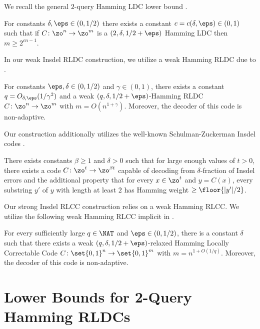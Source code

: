 We recall the general $2$-query Hamming LDC lower bound  \cite{KerenidisW04, Ben-AroyaRW08}.
\begin{theorem}\label{thm:two-query-lb}
    For constants $\delta, \eps \in (0,1/2)$ there exists a constant $c = c(\delta, \eps) \in (0,1)$ such that if $C \colon \zo^n \rightarrow \zo^m$ is a $(2, \delta, 1/2+\eps)$ Hamming LDC then $m \geq 2^{cn-1}$.
\end{theorem}

In our weak Insdel RLDC construction, we utilize a weak Hamming RLDC due to \cite{Ben-SassonGHSV06}.
\begin{lemma}\label{lem:weak-ham-rldc}
    For constants $\eps, \delta \in (0,1/2)$ and $\gamma \in (0,1)$, there exists a constant $q = O_{\delta,\eps}(1/\gamma^2)$ and a weak $(q,\delta, 1/2+\eps)$-Hamming RLDC $C \colon \zo^n \rightarrow \zo^m$ with $m = O(n^{1+\gamma})$.
    Moreover, the decoder of this code is non-adaptive.
\end{lemma}

Our construction additionally utilizes the well-known Schulman-Zuckerman Insdel codes \cite{SchZuc99}.
\begin{lemma}\label{lem:sz-code}
    There exists constants $\beta \geq 1$ and $\delta > 0$ such that for large enough values of $t > 0$, there exists a code $C \colon \zo^t \rightarrow \zo^{\beta t}$ capable of decoding from $\delta$-fraction of Insdel errors and the additional property that for every $x \in \zo^t$ and $y = C(x)$, every substring $y'$ of $y$ with length at least $2$ has Hamming weight $\geq \floor{|y'|/2}$.
\end{lemma}

Our strong Insdel RLCC construction relies on a weak Hamming RLCC.
We utilize the following weak Hamming RLCC implicit in \cite{AsadiS21}.
\begin{lemma}
\label{lem:rlcc}
    For every sufficiently large $q\in \NAT$ and $\eps\in (0,1/2)$, there is a constant $\delta$ such that there exists a weak $(q, \delta, 1/2 + \eps)$-relaxed Hamming Locally Correctable Code $C\colon \set{0,1}^n\rightarrow \set{0,1}^m$ with $m = n^{1+O(1/q)}$. 
    Moreover, the decoder of this code is non-adaptive.
\end{lemma}

\section{Lower Bounds for 2-Query Hamming RLDCs} \label{sec:2qrldc}

